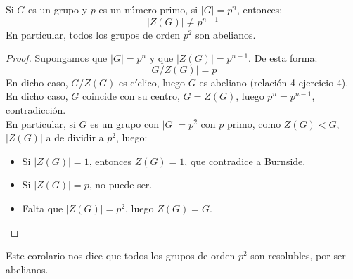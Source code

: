 \begin{coro}
    Si $G$ es un grupo y $p$ es un número primo, si $|G| = p^n$, entonces:
    \begin{equation*}
        |Z(G)| \neq p^{n-1}
    \end{equation*}
    En particular, todos los grupos de orden $p^2$ son abelianos.
    \begin{proof}
        Supongamos que $|G| = p^n$ y que $|Z(G)| = p^{n-1}$. De esta forma:
        \begin{equation*}
            |G/Z(G)| = p
        \end{equation*}
        En dicho caso, $G/Z(G)$ es cíclico, luego $G$ es abeliano (relación 4 ejercicio 4). En dicho caso, $G$ coincide con su centro, $G = Z(G)$, luego $p^n = p^{n-1}$, \underline{contradicción}.\\

        \noindent
        En particular, si $G$ es un grupo con $|G| = p^2$ con $p$ primo, como $Z(G) < G$, $|Z(G)| $ a de dividir a $p^2$, luego:
        \begin{itemize}
            \item Si $|Z(G)| = 1$, entonces $Z(G) = 1$, que contradice a Burnside.
            \item Si $|Z(G)| = p$, no puede ser.
            \item Falta que $|Z(G)| = p^2$, luego $Z(G) = G$.
        \end{itemize}
    \end{proof}
\end{coro}

\noindent
Este corolario nos dice que todos los grupos de orden $p^2$ son resolubles, por ser abelianos.

